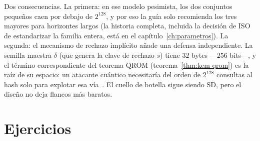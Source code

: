\documentclass[11pt,a4paper,oneside]{report}
\begin{document}
Dos consecuencias. La primera: en ese modelo pesimista, los dos
conjuntos pequeños caen por debajo de $2^{128}$, y por eso la guía
solo recomienda los tres mayores para horizontes largos (la
historia completa, incluida la decisión de ISO de estandarizar la
familia entera, está en el capítulo~\ref{ch:parametros}). La
segunda: el mecanismo de rechazo implícito añade una defensa
independiente. La semilla maestra $\delta$ (que genera la clave de rechazo
$s$) tiene $32$ bytes ---$256$ bits---, y el término correspondiente del
teorema QROM
(teorema~\ref{thm:kem-qrom}) es la raíz de su espacio: un atacante
cuántico necesitaría del orden de $2^{128}$ consultas al hash solo
para explotar esa vía~\cite{cmsecurity}. El cuello de botella sigue
siendo SD, pero el diseño no deja flancos más baratos.

\section{Ejercicios}
\end{document}
